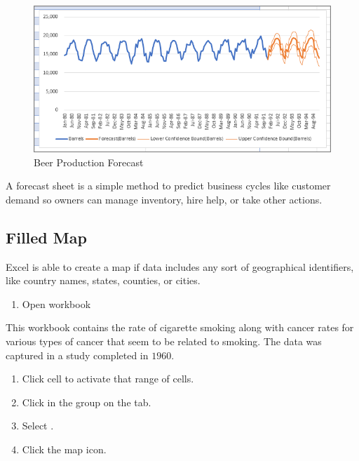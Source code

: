 \begin{figure}[H]
	\centering
	\includegraphics[width=\maxwidth{.95\linewidth}]{gfx/ch08_fig14}
	\caption{Beer Production Forecast}
	\label{08:fig14}
\end{figure}

A forecast sheet is a simple method to predict business cycles like customer demand so owners can manage inventory, hire help, or take other actions.

\subsection{Filled Map}

Excel is able to create a map if data includes any sort of geographical identifiers, like country names, states, counties, or cities. 

\begin{enumerate}
	\item Open workbook 
\end{enumerate}

This workbook contains the rate of cigarette smoking along with cancer rates for various types of cancer that seem to be related to smoking. The data was captured in a study completed in $ 1960 $.

\begin{enumerate}[resume]
	\item Click cell  to activate that range of cells.
	\item Click  in the  group on the  tab.
	\item Select .
	\item Click the map icon.
\end{enumerate}

